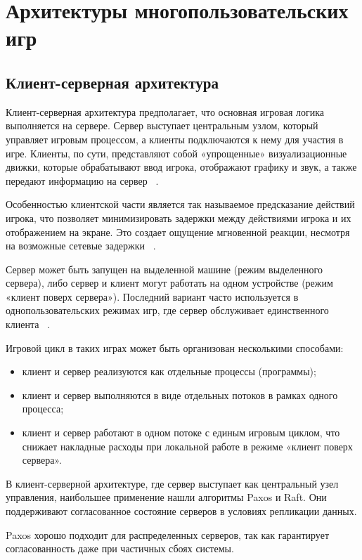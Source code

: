 \chapter{Архитектуры многопользовательских игр}

\section{Клиент-серверная архитектура}
Клиент-серверная архитектура предполагает, что основная игровая логика выполняется на сервере. Сервер выступает центральным узлом, который управляет игровым процессом, а клиенты подключаются к нему для участия в игре. Клиенты, по сути, представляют собой «упрощенные» визуализационные движки, которые обрабатывают ввод игрока, отображают графику и звук, а также передают информацию на сервер ~\cite{b4}.

Особенностью клиентской части является так называемое предсказание действий игрока, что позволяет минимизировать задержки между действиями игрока и их отображением на экране. Это создает ощущение мгновенной реакции, несмотря на возможные сетевые задержки ~\cite{b4}.

Сервер может быть запущен на выделенной машине (режим выделенного сервера), либо сервер и клиент могут работать на одном устройстве (режим «клиент поверх сервера»). Последний вариант часто используется в однопользовательских режимах игр, где сервер обслуживает единственного клиента ~\cite{b4}.

Игровой цикл в таких играх может быть организован несколькими способами:
\begin{itemize}
	\item клиент и сервер реализуются как отдельные процессы (программы);
	\item клиент и сервер выполняются в виде отдельных потоков в рамках одного процесса;
	\item клиент и сервер работают в одном потоке с единым игровым циклом, что снижает накладные расходы при локальной работе в режиме «клиент поверх сервера».
\end{itemize}

В клиент-серверной архитектуре, где сервер выступает как центральный узел управления, наибольшее применение нашли алгоритмы Paxos и Raft. Они поддерживают согласованное состояние серверов в условиях репликации данных. 

Paxos хорошо подходит для распределенных серверов, так как гарантирует согласованность даже при частичных сбоях системы.

